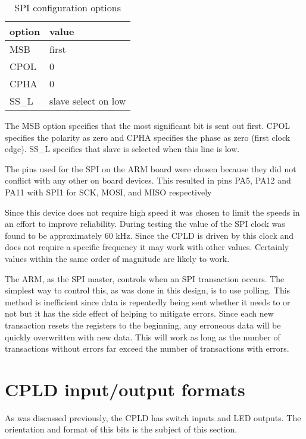 \documentclass{article}
\begin{document}
\begin{table}
\center
\begin{tabular}{|l|l|}
	\hline
	option & value \\
	\hline
	MSB & first \\
	CPOL & 0 \\
	CPHA & 0 \\
	SS\_L & slave select on low \\
	\hline
\end{tabular}
\caption{SPI configuration options}
\label{tbl:spi}
\end{table}

The MSB option specifies that the most significant bit is sent
out first.
CPOL specifies the polarity as zero and CPHA specifies the phase
as zero (first clock edge).
SS\_L specifies that slave is selected when this line is low.

The pins used for the SPI on the ARM board were chosen because
they did not conflict with any other on board devices.
This resulted in pins PA5, PA12 and PA11 with SPI1 for SCK, MOSI,
and MISO respectively\cite[Pg. 24]{UM1079}

Since this device does not require high speed it was
chosen to limit the speeds in an effort to improve reliability.
During testing the value of the SPI clock was found to be approximately
60 kHz.
Since the CPLD is driven by this clock and does not require a specific
frequency it may work with other values.
Certainly values within the same order of magnitude are likely to work.

The ARM, as the SPI master, controls when an SPI transaction occurs.
The simplest way to control this, as was done in this design, is to use polling.
This method is inefficient since data is repeatedly being sent
whether it needs to or not
but it has the side effect of helping to mitigate errors.
Since each new transaction resets the registers to the beginning,
any erroneous data will be quickly overwritten with new data.
This will work as long as the number of transactions without errors
far exceed the number of transactions with errors.


\section{CPLD input/output formats}
\label{sec:cpld}

As was discussed previously, the CPLD has switch inputs
and LED outputs.
The orientation and format of this bits is the subject of
this section.
\end{document}
